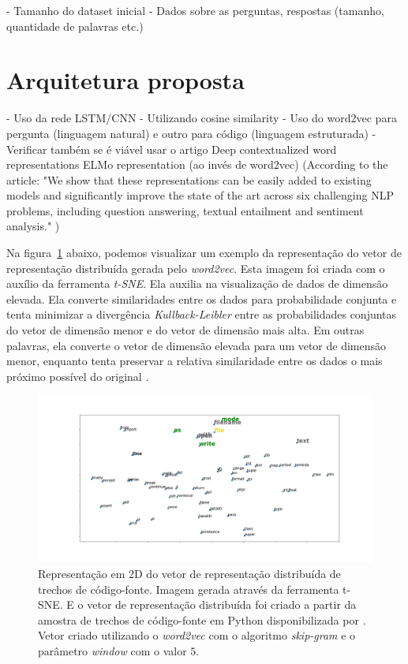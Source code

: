  - Tamanho do dataset inicial
 - Dados sobre as perguntas, respostas (tamanho, quantidade de palavras etc.)

\section{Arquitetura proposta} 

- Uso da rede LSTM/CNN 
       - Utilizando cosine similarity
       - Uso do word2vec para pergunta (linguagem natural) e outro para código (linguagem estruturada) - Verificar também se é viável usar o artigo Deep contextualized word representations ELMo representation (ao invés de word2vec) (According to the article: "We show that
these representations can be easily added to
existing models and significantly improve the
state of the art across six challenging NLP
problems, including question answering, textual entailment and sentiment analysis." )



Na figura~\ref{fig:tsne-code-snippet-python} abaixo, podemos visualizar um exemplo da representação do vetor de representação distribuída gerada pelo \textit{word2vec}. Esta imagem foi criada com o auxílio da ferramenta \textit{t-SNE}. Ela auxilia na visualização de dados de dimensão elevada. Ela converte similaridades entre os dados para probabilidade conjunta e tenta minimizar a divergência \emph{Kullback-Leibler} entre as probabilidades conjuntas do vetor de dimensão menor e do vetor de dimensão mais alta. Em outras palavras, ela converte o vetor de dimensão elevada para um vetor de dimensão menor, enquanto tenta preservar a relativa similaridade entre os dados o mais próximo possível do original \citep{scikit-learn-tsne-2019, quora-tsne-2019}.




\begin{figure}[h]
\includegraphics[width=1\textwidth]{figuras/cap-trabalhos-relacionados/code-tsne-output.png}
\caption{Representação em 2D do vetor de representação distribuída de trechos de código-fonte. Imagem gerada através da ferramenta t-SNE. E o vetor de representação distribuída foi criado a partir da amostra de trechos de código-fonte em Python disponibilizada por \cite{yao-2018}. Vetor criado utilizando o \textit{word2vec} com o algoritmo \textit{skip-gram} e o parâmetro \textit{window} com o valor $5$.}
\label{fig:tsne-code-snippet-python}
\end{figure}

